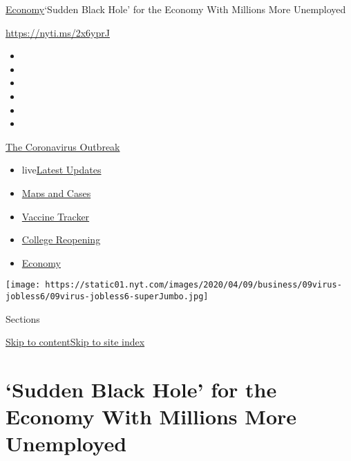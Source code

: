 \href{/section/business/economy}{Economy}\textbar{}`Sudden Black Hole'
for the Economy With Millions More Unemployed

\url{https://nyti.ms/2x6yprJ}

\begin{itemize}
\item
\item
\item
\item
\item
\item
\end{itemize}

\href{https://www.nytimes.com/news-event/coronavirus?action=click\&pgtype=Article\&state=default\&region=TOP_BANNER\&context=storylines_menu}{The
Coronavirus Outbreak}

\begin{itemize}
\tightlist
\item
  live\href{https://www.nytimes.com/2020/08/04/world/coronavirus-covid-19.html?action=click\&pgtype=Article\&state=default\&region=TOP_BANNER\&context=storylines_menu}{Latest
  Updates}
\item
  \href{https://www.nytimes.com/interactive/2020/us/coronavirus-us-cases.html?action=click\&pgtype=Article\&state=default\&region=TOP_BANNER\&context=storylines_menu}{Maps
  and Cases}
\item
  \href{https://www.nytimes.com/interactive/2020/science/coronavirus-vaccine-tracker.html?action=click\&pgtype=Article\&state=default\&region=TOP_BANNER\&context=storylines_menu}{Vaccine
  Tracker}
\item
  \href{https://www.nytimes.com/2020/08/02/us/covid-college-reopening.html?action=click\&pgtype=Article\&state=default\&region=TOP_BANNER\&context=storylines_menu}{College
  Reopening}
\item
  \href{https://www.nytimes.com/live/2020/08/03/business/stock-market-today-coronavirus?action=click\&pgtype=Article\&state=default\&region=TOP_BANNER\&context=storylines_menu}{Economy}
\end{itemize}

\texttt{[image: https://static01.nyt.com/images/2020/04/09/business/09virus-jobless6/09virus-jobless6-superJumbo.jpg]}

Sections

\protect\hyperlink{site-content}{Skip to
content}\protect\hyperlink{site-index}{Skip to site index}

\hypertarget{sudden-black-hole-for-the-economy-with-millions-more-unemployed}{%
\section{`Sudden Black Hole' for the Economy With Millions More
Unemployed}\label{sudden-black-hole-for-the-economy-with-millions-more-unemployed}}

